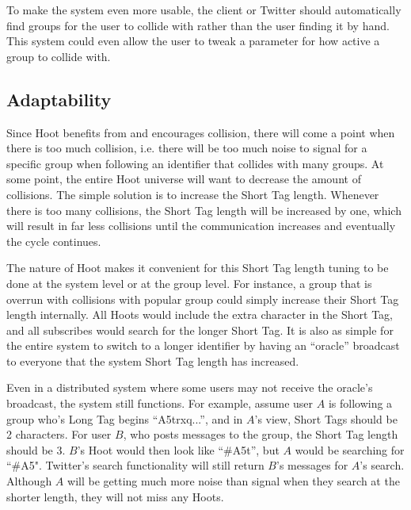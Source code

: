 To make the system even more usable, the client or Twitter should automatically find groups for the user to collide with rather than the user finding it by hand. This system could even allow the user to tweak a parameter for how active a group to collide with.



\subsection{Adaptability}

Since Hoot benefits from and encourages collision, there will come a point when there is too much collision, i.e. there will be too much noise to signal for a specific group when following an identifier that collides with many groups. At some point, the entire Hoot universe will want to decrease the amount of collisions. The simple solution is to increase the Short Tag length. Whenever there is too many collisions, the Short Tag length will be increased by one, which will result in far less collisions until the communication increases and eventually the cycle continues. 

The nature of Hoot makes it convenient for this Short Tag length tuning to be done at the system level or at the group level. For instance, a group that is overrun with collisions with popular group could simply increase their Short Tag length internally. All Hoots would include the extra character in the Short Tag, and all subscribes would search for the longer Short Tag. It is also as simple for the entire system to switch to a longer identifier by having an ``oracle'' broadcast to everyone that the system Short Tag length has increased.

Even in a distributed system where some users may not receive the oracle's broadcast, the system still functions. For example, assume user $A$ is following a group who's Long Tag begins ``A5trxq...'', and in $A$'s view, Short Tags should be 2 characters. For user $B$, who posts messages to the group, the Short Tag length should be 3. $B$'s Hoot would then look like ``\#A5t'', but $A$ would be searching for ``\#A5". Twitter's search functionality will still return $B$'s messages for $A$'s search. Although $A$ will be getting much more noise than signal when they search at the shorter length, they will not miss any Hoots.

